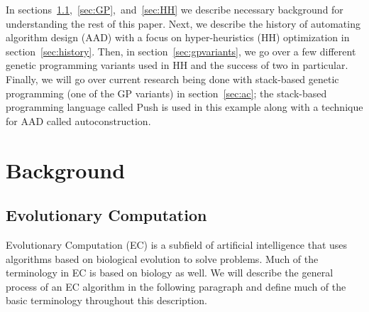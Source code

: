 \documentclass{sig-alternate}
\begin{document}
In sections~\ref{sec:evocomp},~\ref{sec:GP},~and~\ref{sec:HH} we describe necessary background for understanding the rest of this paper. Next, we describe the history of automating algorithm design (AAD) with a focus on hyper-heuristics (HH) optimization in section~\ref{sec:history}. Then, in section~\ref{sec:gpvariants}, we go over a few different genetic programming variants used in HH and the success of two in particular. Finally, we will go over current research being done with stack-based genetic programming (one of the GP variants) in section~\ref{sec:ac}; the stack-based programming language called Push is used in this example along with a technique for AAD called autoconstruction.

\section{Background}
\label{sec:background}

\subsection{Evolutionary Computation}
\label{sec:evocomp}
Evolutionary Computation (EC) is a subfield of artificial intelligence that uses algorithms based on biological evolution to solve problems. Much of the terminology in EC is based on biology as well. We will describe the general process of an EC algorithm in the following paragraph and define much of the basic terminology throughout this description.
\end{document}
